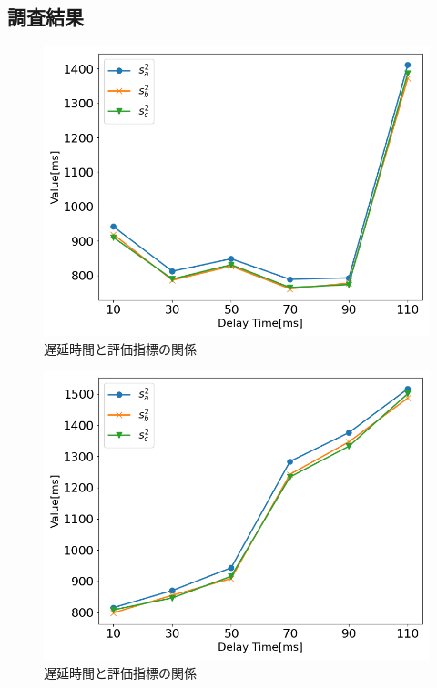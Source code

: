 \subsection{調査結果}
\begin{figure}[tbp]
  \centering
  \includegraphics[scale=0.5]{figures/Yobi/Var/Normal_bunnsann.png}
  \caption{遅延時間と評価指標の関係}
  \label{fig:Normal_bunsan}
\end{figure}
\begin{figure}[bt]
  \centering
  \includegraphics[scale=0.5]{figures/Yobi/Var/Unique_bunsan.png}
  \caption{遅延時間と評価指標の関係}
  \label{fig:Unique_bunsan}
\end{figure}
